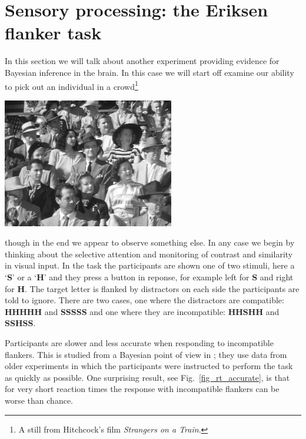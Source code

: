 \documentclass[12pt]{article}
\begin{document}
\section*{Sensory processing: the Eriksen flanker task}

In this section we will talk about another experiment providing
evidence for Bayesian inference in the brain. In this case we will
start off examine our ability to pick out an individual in a crowd\footnote{A still from Hitchcock's film \textsl{Strangers on a Train}.}
\begin{center}
\includegraphics[width=7.5cm]{Strangers_on_a_Train.png}
\end{center}
though in the end we appear to observe something else. In any case we
begin by thinking about the selective attention and monitoring of
contrast and similarity in visual input. In the task the participants
are shown one of two stimuli, here a \lq{}\textbf{S}\rq{} or a
\lq{}\textbf{H}\rq{} and they press a button in reponse, for example
left for \textbf{S} and right for \textbf{H}. The target letter is
flanked by distractors on each side the participants are told to
ignore. There are two cases, one where the distractors are compatible:
\textbf{HHHHH} and \textbf{SSSSS} and one where they are incompatible:
\textbf{HHSHH} and \textbf{SSHSS}.

Participants are slower and less accurate when responding to
incompatible flankers. This is studied from a Bayesian point of view
in \cite{YuDayanCohen2009}; they use data from older experiments in
which the participants were instructed to perform the task as quickly
as possible. One surprising result, see Fig.~\ref{fig_rt_accurate}, is
that for very short reaction times the response with incompatible
flankers can be worse than chance.
\end{document}
